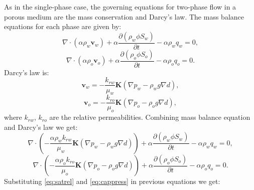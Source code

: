 \documentclass[12pt]{report}
\begin{document}
As in the single-phase case, the governing equations for two-phase flow in a porous medium are the mass 
conservation and Darcy's law. 
The mass balance equations for each phase are given by:
\begin{equation*}
 \nabla \cdot (\alpha \rho_w \mathbf{v}_w)+\alpha \frac{\partial(\rho_w \phi S_w)}{\partial t}-\alpha \rho_w q_w=0,
\end{equation*}
\begin{equation*}
 \nabla \cdot (\alpha \rho_o \mathbf{v}_o)+\alpha \frac{\partial(\rho_o \phi S_o)}{\partial t}-\alpha \rho_o q_o=0.
\end{equation*}
Darcy's law is:
\begin{equation*}
\mathbf{v}_w=-\frac{k_{rw}}{\mu_w} \mathbf{K}(\nabla p_w-\rho_w g \nabla d),
\end{equation*}
\begin{equation*}
\mathbf{v}_o=-\frac{k_{ro}}{\mu_o} \mathbf{K}(\nabla p_o-\rho_o g \nabla d),
\end{equation*}
where $k_{rw}$, $k_{ro}$ are the relative permeabilities.
Combining mass balance equation and Darcy's law we get:
\begin{equation*}
 \nabla \cdot \left( -\frac{\alpha \rho_wk_{rw}}{\mu_w} \mathbf{K}(\nabla p_w-\rho_w g \nabla d)\right)+\alpha \frac{\partial(\rho_w \phi S_w)}{\partial t}-\alpha \rho_w q_w=0,
\end{equation*}
\begin{equation*}
 \nabla \cdot \left( -\frac{\alpha \rho_ok_{ro}}{\mu_o} \mathbf{K}(\nabla p_o-\rho_o g \nabla d)\right)+\alpha \frac{\partial(\rho_o \phi S_o)}{\partial t}-\alpha \rho_o q_o=0.
\end{equation*}
Substituting \eqref{eq:satrel} and \eqref{eq:cappress} in previous equations we get:
\end{document}
